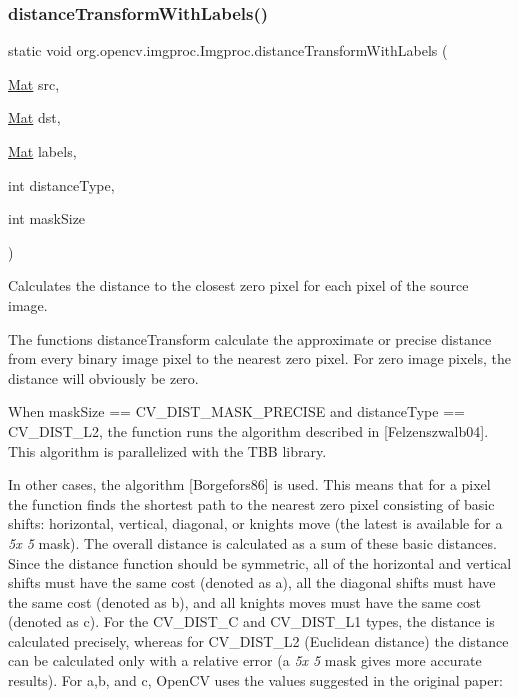 \subsubsection{\texorpdfstring{distance\+Transform\+With\+Labels()}{distanceTransformWithLabels()}\hspace{0.1cm}{\footnotesize\ttfamily [2/2]}}
{\footnotesize\ttfamily static void org.\+opencv.\+imgproc.\+Imgproc.\+distance\+Transform\+With\+Labels (\begin{DoxyParamCaption}\item[{\mbox{\hyperlink{classorg_1_1opencv_1_1core_1_1_mat}{Mat}}}]{src,  }\item[{\mbox{\hyperlink{classorg_1_1opencv_1_1core_1_1_mat}{Mat}}}]{dst,  }\item[{\mbox{\hyperlink{classorg_1_1opencv_1_1core_1_1_mat}{Mat}}}]{labels,  }\item[{int}]{distance\+Type,  }\item[{int}]{mask\+Size }\end{DoxyParamCaption})\hspace{0.3cm}{\ttfamily [static]}}

Calculates the distance to the closest zero pixel for each pixel of the source image.

The functions {\ttfamily distance\+Transform} calculate the approximate or precise distance from every binary image pixel to the nearest zero pixel. For zero image pixels, the distance will obviously be zero.

When {\ttfamily mask\+Size == C\+V\+\_\+\+D\+I\+S\+T\+\_\+\+M\+A\+S\+K\+\_\+\+P\+R\+E\+C\+I\+SE} and {\ttfamily distance\+Type == C\+V\+\_\+\+D\+I\+S\+T\+\_\+\+L2}, the function runs the algorithm described in \mbox{[}Felzenszwalb04\mbox{]}. This algorithm is parallelized with the T\+BB library.

In other cases, the algorithm \mbox{[}Borgefors86\mbox{]} is used. This means that for a pixel the function finds the shortest path to the nearest zero pixel consisting of basic shifts\+: horizontal, vertical, diagonal, or knight\textquotesingle{}s move (the latest is available for a {\itshape 5x 5} mask). The overall distance is calculated as a sum of these basic distances. Since the distance function should be symmetric, all of the horizontal and vertical shifts must have the same cost (denoted as {\ttfamily a}), all the diagonal shifts must have the same cost (denoted as {\ttfamily b}), and all knight\textquotesingle{}s moves must have the same cost (denoted as {\ttfamily c}). For the {\ttfamily C\+V\+\_\+\+D\+I\+S\+T\+\_\+C} and {\ttfamily C\+V\+\_\+\+D\+I\+S\+T\+\_\+\+L1} types, the distance is calculated precisely, whereas for {\ttfamily C\+V\+\_\+\+D\+I\+S\+T\+\_\+\+L2} (Euclidean distance) the distance can be calculated only with a relative error (a {\itshape 5x 5} mask gives more accurate results). For {\ttfamily a},{\ttfamily b}, and {\ttfamily c}, Open\+CV uses the values suggested in the original paper\+:

